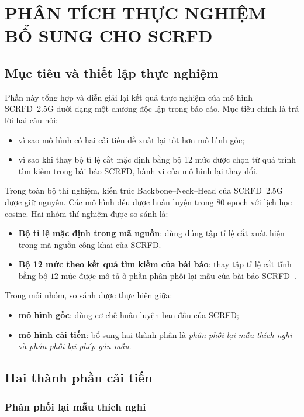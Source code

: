 \chapter{PHÂN TÍCH THỰC NGHIỆM BỔ SUNG CHO SCRFD}

\section{Mục tiêu và thiết lập thực nghiệm}

Phần này tổng hợp và diễn giải lại kết quả thực nghiệm của mô hình SCRFD~2.5G dưới dạng một chương độc lập trong báo cáo.
Mục tiêu chính là trả lời hai câu hỏi:
\begin{itemize}
  \item vì sao mô hình có hai cải tiến đề xuất lại tốt hơn mô hình gốc;
  \item vì sao khi thay bộ tỉ lệ cắt mặc định bằng bộ 12 mức được chọn từ quá trình tìm kiếm trong bài báo SCRFD, hành vi của mô hình lại thay đổi.
\end{itemize}

Trong toàn bộ thí nghiệm, kiến trúc Backbone--Neck--Head của SCRFD~2.5G được giữ nguyên.
Các mô hình đều được huấn luyện trong \(80\) epoch với lịch học cosine.
Hai nhóm thí nghiệm được so sánh là:
\begin{itemize}
  \item \textbf{Bộ tỉ lệ mặc định trong mã nguồn}: dùng đúng tập tỉ lệ cắt xuất hiện trong mã nguồn công khai của SCRFD.
  \item \textbf{Bộ 12 mức theo kết quả tìm kiếm của bài báo}: thay tập tỉ lệ cắt tĩnh bằng bộ \(12\) mức được mô tả ở phần phân phối lại mẫu của bài báo SCRFD~\cite{guo2022scrfd}.
\end{itemize}

Trong mỗi nhóm, so sánh được thực hiện giữa:
\begin{itemize}
  \item \textbf{mô hình gốc}: dùng cơ chế huấn luyện ban đầu của SCRFD;
  \item \textbf{mô hình cải tiến}: bổ sung hai thành phần là \emph{phân phối lại mẫu thích nghi} và \emph{phân phối lại phép gán mẫu}.
\end{itemize}

\section{Hai thành phần cải tiến}

\subsection{Phân phối lại mẫu thích nghi}

